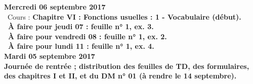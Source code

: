 \documentclass[12pt,a4paper]{article}
\begin{document}
% 
%  
% 
% 

%   
\noindent\textbf{\bf Mercredi 06 septembre 2017}\\
\bu\ Cours : \bf Chapitre VI \rm : Fonctions usuelles : 1 - Vocabulaire (début).\\
\bu\ À faire pour jeudi 07 : feuille n° 1, ex. 3.\\
\bu\ À faire pour vendredi 08 : feuille n° 1, ex. 2.\\
\bu\ À faire pour lundi 11 : feuille n° 1, ex. 4.\vspace{.4cm}\\

\noindent\textbf{\bf Mardi 05 septembre 2017}\\
Journée de rentrée ; distribution des feuilles de TD, des formulaires, des
chapitres I et II, et du DM n° 01 (à rendre le 14 septembre).\vspace{.4cm}\\


\label{end}
\end{document}
